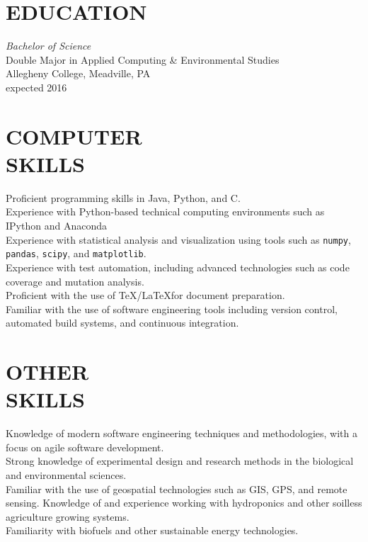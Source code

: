 \documentclass[line,margin]{res}
\begin{document}
\address{990 First St, Meadville, PA, 16335}
\address{814-853-1501 | weismanm@allegheny.edu}

 
\begin{resume}
 
\section{EDUCATION} {\sl Bachelor of Science} \\
                Double Major in Applied Computing \& Environmental Studies \\
                Allegheny College, Meadville, PA \\
                expected 2016
 
\section{COMPUTER \\ SKILLS} 
                Proficient programming skills in Java, Python, and C. \\
                Experience with Python-based technical computing environments such as IPython and Anaconda \\
                Experience with statistical analysis and visualization using tools such as \texttt{numpy}, \texttt{pandas}, \texttt{scipy}, and \texttt{matplotlib}. \\
                Experience with test automation, including advanced technologies such as code coverage and mutation analysis. \\
                Proficient with the use of \TeX/\LaTeX for document preparation. \\
                Familiar with the use of software engineering tools including version control, automated build systems, and continuous integration.

\section{OTHER \\ SKILLS}
                Knowledge of modern software engineering techniques and methodologies, with a focus on agile software development.\\
                Strong knowledge of experimental design and research methods in the biological and environmental sciences. \\
                Familiar with the use of geospatial technologies such as GIS, GPS, and remote sensing.
                Knowledge of and experience working with hydroponics and other soilless agriculture growing systems.\\
                Familiarity with biofuels and other sustainable energy technologies.


\end{resume}
\end{document}
